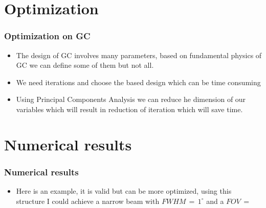 \documentclass{beamer}
\begin{document}
\section{Optimization} 
\begin{frame}
\frametitle{Optimization on GC}
\begin{itemize}
\item  The design of GC involves many parameters, based on fundamental physics of GC we can define some of them but not all.
\item We need iterations and choose the based design which can be time consuming
\item Using Principal Components Analysis we can reduce he dimension of our variables which will result in reduction of iteration which will save time.
\end{itemize}
\end{frame}
\section{Numerical results} 
\begin{frame}
\frametitle{Numerical results}
\begin{itemize}
\item  Here is an example, it is valid but can be more optimized, using this structure I could achieve a narrow beam with $FWHM \, = \, 1^{\circ}$ and a $FOV \,  = \, $
\end{itemize}
\end{frame}
\end{document}
